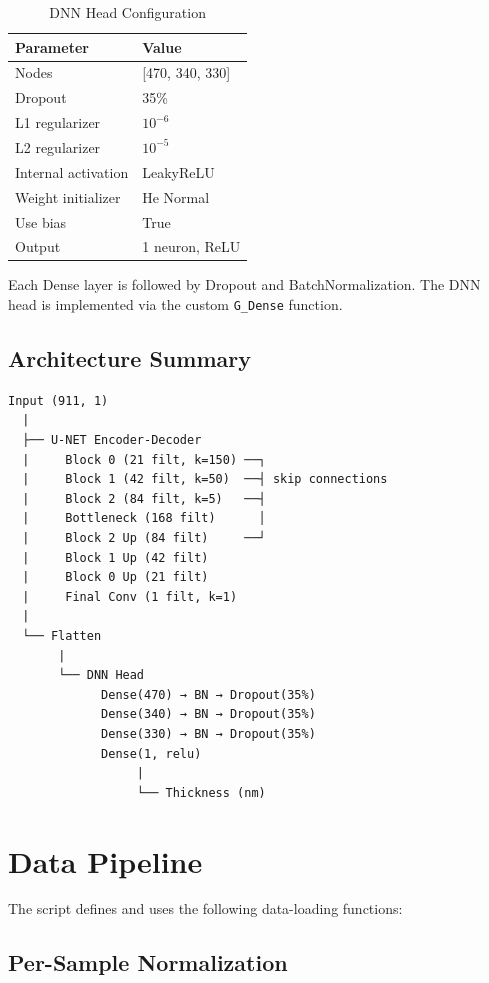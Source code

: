 \documentclass[11pt,a4paper]{article}
\begin{document}
\begin{table}[H]
\centering
\caption{DNN Head Configuration}
\begin{tabular}{ll}
\toprule
\textbf{Parameter} & \textbf{Value} \\
\midrule
Nodes & [470, 340, 330] \\
Dropout & 35\% \\
L1 regularizer & $10^{-6}$ \\
L2 regularizer & $10^{-5}$ \\
Internal activation & LeakyReLU \\
Weight initializer & He Normal \\
Use bias & True \\
Output & 1 neuron, ReLU \\
\bottomrule
\end{tabular}
\end{table}

Each Dense layer is followed by Dropout and BatchNormalization. The DNN head is implemented via the custom \texttt{G\_Dense} function.

\subsection{Architecture Summary}

\begin{verbatim}
Input (911, 1)
  |
  ├── U-NET Encoder-Decoder
  |     Block 0 (21 filt, k=150) ──┐
  |     Block 1 (42 filt, k=50)  ──┤ skip connections
  |     Block 2 (84 filt, k=5)   ──┤
  |     Bottleneck (168 filt)      │
  |     Block 2 Up (84 filt)     ──┘
  |     Block 1 Up (42 filt)
  |     Block 0 Up (21 filt)
  |     Final Conv (1 filt, k=1)
  |
  └── Flatten
       |
       └── DNN Head
             Dense(470) → BN → Dropout(35%)
             Dense(340) → BN → Dropout(35%)
             Dense(330) → BN → Dropout(35%)
             Dense(1, relu)
                  |
                  └── Thickness (nm)
\end{verbatim}

\section{Data Pipeline}

The script defines and uses the following data-loading functions:

\subsection{Per-Sample Normalization}
\end{document}
